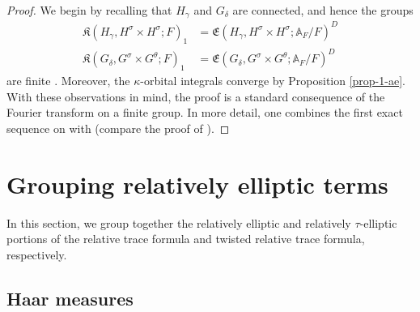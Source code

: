 \documentclass[12pt]{amsart}
\theoremstyle{remark}
\numberwithin{equation}{section}
\newcommand{\A}{\mathbb{A}}
\theoremstyle{definition}
\numberwithin{equation}{subsection}
\begin{document}
\begin{proof}
We begin by recalling that $H_{\gamma}$ and $G_{\delta}$ are connected, and hence the groups
\begin{align*}
\mathfrak{K}(H_{\gamma},H^{\sigma} \times H^{\sigma};F)_1&=\mathfrak{E}(H_{\gamma},H^{\sigma} \times H^{\sigma};\A_F/F)^D\\
\mathfrak{K}(G_{\delta},{G}^{\sigma} \times {G}^{\theta};F)_1&=
\mathfrak{E}(G_{\delta},{G}^{\sigma} \times {G}^{\theta};\A_F/F)^D
\end{align*}
are finite \cite[Proposition 1.8.4]{Lab}. Moreover, the $\kappa$-orbital integrals converge by Proposition \ref{prop-1-ae}.  With these observations
 in mind, the proof is a standard consequence of the Fourier transform on a finite
group. In more detail, one combines the first exact sequence on
 \cite[p.~42]{Lab} with \cite[Proposition 1.8.5 and 1.8.6]{Lab} (compare the proof of \cite[Proposition 4.2.1]{Lab}).
\end{proof}





\section{Grouping relatively elliptic terms} \label{sec-group-ell}

In this section, we group together the relatively elliptic and relatively $\tau$-elliptic portions of the relative trace
formula and twisted relative trace formula, respectively.

\subsection{Haar measures} \label{ssec-measures}
\end{document}
